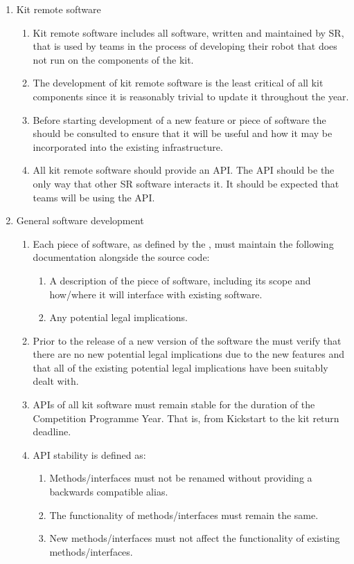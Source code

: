 \begin{enumerate}
\begin{enumerate}
\begin{enumerate}
      \end{enumerate}
    \item Kit remote software
      \begin{enumerate}
        \item Kit remote software includes all software, written and maintained by SR, that is used by teams in the process of developing their robot that does not run on the components of the kit.
        \item The development of kit remote software is the least critical of all kit components since it is reasonably trivial to update it throughout the year.
        \item Before starting development of a new feature or piece of software the  should be consulted to ensure that it will be useful and how it may be incorporated into the existing infrastructure.
        \item All kit remote software should provide an API. The API should be the only way that other SR software interacts it. It should be expected that teams will be using the API.
      \end{enumerate}
    \item General software development
      \begin{enumerate}
        \item Each piece of software, as defined by the , must maintain the following documentation alongside the source code:
          \begin{enumerate}
            \item A description of the piece of software, including its scope and how/where it will interface with existing software.
            \item Any potential legal implications.
          \end{enumerate}
        \item Prior to the release of a new version of the software the  must verify that there are no new potential legal implications due to the new features and that all of the existing potential legal implications have been suitably dealt with.
        \item APIs of all kit software must remain stable for the duration of the Competition Programme Year. That is, from Kickstart to the kit return deadline.
        \item API stability is defined as:
          \begin{enumerate}
            \item Methods/interfaces must not be renamed without providing a backwards compatible alias.
            \item The functionality of methods/interfaces must remain the same.
            \item New methods/interfaces must not affect the functionality of existing methods/interfaces.
          \end{enumerate}
      \end{enumerate}
  \end{enumerate}


\end{enumerate}
